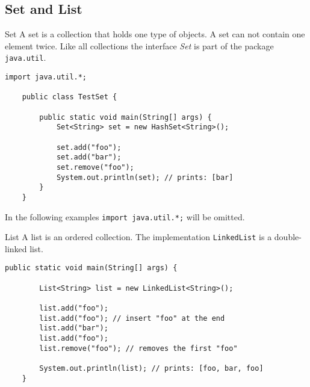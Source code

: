 \subsection{Set and List}
\begin{frame}[fragile]{Set}
    A set is a collection that holds one type of objects.
    A set can not contain one element twice.
    Like all collections the interface \emph{Set} is part of the package \texttt{java.util}.
    \begin{lstlisting}[basicstyle=\ttfamily\scriptsize]
    import java.util.*;

    public class TestSet {
        
        public static void main(String[] args) {
            Set<String> set = new HashSet<String>();
        
            set.add("foo");
            set.add("bar");
            set.remove("foo");
            System.out.println(set); // prints: [bar]
        }
    }
    \end{lstlisting}
    In the following examples \texttt{import java.util.*;} will be omitted.
\end{frame}

\begin{frame}[fragile]{List}
    A list is an ordered collection.
    \vfill
    The implementation \texttt{LinkedList} is a double-linked list.
    \begin{lstlisting}[basicstyle=\ttfamily\scriptsize]
    public static void main(String[] args) {
    
        List<String> list = new LinkedList<String>();
        
        list.add("foo"); 
        list.add("foo"); // insert "foo" at the end
        list.add("bar");
        list.add("foo");
        list.remove("foo"); // removes the first "foo"
        
        System.out.println(list); // prints: [foo, bar, foo]
    }
    \end{lstlisting}
\end{frame}
    
